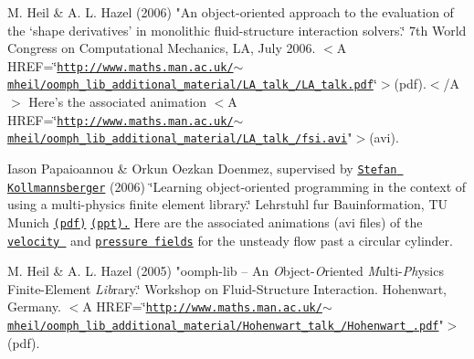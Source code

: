 \begin{DoxyItemize}
\item M. Heil \& A. L. Hazel (2006) "An object-\/oriented approach to the evaluation of the `shape derivatives' in monolithic fluid-\/structure interaction solvers.\char`\"{} 7th World Congress on Computational Mechanics,
  L\-A, July 2006. $<$\-A H\-R\-E\-F=\char`\"{}\href{http://www.maths.man.ac.uk/~mheil/oomph_lib_additional_material/LA_talk_2006/LA_talk.pdf}{\tt http\-://www.\-maths.\-man.\-ac.\-uk/$\sim$mheil/oomph\-\_\-lib\-\_\-additional\-\_\-material/\-L\-A\-\_\-talk\-\_/\-L\-A\-\_\-talk.\-pdf}\char`\"{}$>$(pdf).$<$/\-A$>$
  Here's the associated animation $<$\-A H\-R\-E\-F=\char`\"{}\href{http://www.maths.man.ac.uk/~mheil/oomph_lib_additional_material/LA_talk_2006/fsi.avi}{\tt http\-://www.\-maths.\-man.\-ac.\-uk/$\sim$mheil/oomph\-\_\-lib\-\_\-additional\-\_\-material/\-L\-A\-\_\-talk\-\_/fsi.\-avi}"$>$(avi).
\end{DoxyItemize}


\begin{DoxyItemize}
\item Iason Papaioannou \& Orkun Oezkan Doenmez, supervised by \href{http://www.inf.bauwesen.tu-muenchen.de/~kollmannsberger/}{\tt Stefan Kollmannsberger} (2006) \char`\"{}\-Learning object-\/oriented programming in
  the context of using a multi-\/physics finite element library.\char`\"{} Lehrstuhl fur Bauinformation, T\-U Munich \href{http://www.maths.man.ac.uk/~mheil/oomph_lib_additional_material/Stefan_Kollmannsberger_2006/Kollmannsberger_Orkun_Iason.pdf}{\tt (pdf)} \href{http://www.maths.man.ac.uk/~mheil/oomph_lib_additional_material/Stefan_Kollmannsberger_2006/Kollmannsberger_Orkun_Iason.ppt}{\tt (ppt).} Here are the associated animations (avi files) of the \href{http://www.maths.man.ac.uk/~mheil/oomph_lib_additional_material/Stefan_Kollmannsberger_2006/velocity.avi}{\tt velocity } and \href{http://www.maths.man.ac.uk/~mheil/oomph_lib_additional_material/Stefan_Kollmannsberger_2006/pressure.avi}{\tt pressure fields} for the unsteady flow past a circular cylinder.
\end{DoxyItemize}


\begin{DoxyItemize}
\item M. Heil \& A. L. Hazel (2005) "{\ttfamily oomph-\/lib} -- An {\itshape O}bject-\/{\itshape O}riented {\itshape M}ulti-\/{\itshape Ph}ysics Finite-\/\-Element {\itshape Lib}rary.\char`\"{} Workshop on Fluid-\/\-Structure
  Interaction. Hohenwart, Germany. $<$\-A H\-R\-E\-F=\char`\"{}\href{http://www.maths.man.ac.uk/~mheil/oomph_lib_additional_material/Hohenwart_talk_2005/Hohenwart_2005.pdf}{\tt http\-://www.\-maths.\-man.\-ac.\-uk/$\sim$mheil/oomph\-\_\-lib\-\_\-additional\-\_\-material/\-Hohenwart\-\_\-talk\-\_/\-Hohenwart\-\_.\-pdf}"$>$(pdf).
\end{DoxyItemize}


